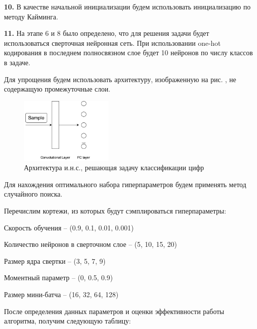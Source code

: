 \textbf{10.} В качестве начальной инициализации будем использовать инициализацию по методу Кайминга.


\textbf{11.} На этапе 6 и 8 было определено, что для решения задачи будет использоваться сверточная нейронная сеть. При использовании one-hot кодирования в последнем полносвязном слое будет 10 нейронов по числу классов в задаче.

Для упрощения будем использовать архитектуру, изображенную на рис. , не содержащую промежуточные слои.

\begin{figure}[h]
	\centering
	\includegraphics[width=0.4\textwidth]{author/part3/figures/model.png}
	\caption{Архитектура и.н.с., решающая задачу классификации цифр}
	\label{fig:model}
\end{figure}

Для нахождения оптимального набора гиперпараметров будем применять метод случайного поиска.

Перечислим кортежи, из которых будут сэмплироваться гиперпараметры:
\begin{textitemize}
	\item Скорость обучения -- (0.9, 0.1, 0.01, 0.001)
	\item Количество нейронов в сверточном слое -- (5, 10, 15, 20)
	\item Размер ядра свертки -- (3, 5, 7, 9)
	\item Моментный параметр -- (0, 0.5, 0.9)
	\item Размер мини-батча -- (16, 32, 64, 128)
\end{textitemize}

После определения данных параметров и оценки эффективности работы алгоритма, получим следующую таблицу:

